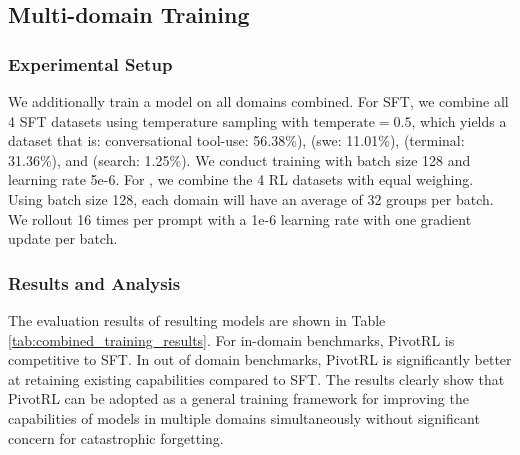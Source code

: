 \subsection{Multi-domain Training}
\subsubsection{Experimental Setup}
We additionally train a model on all domains combined. For SFT, we combine all 4 SFT datasets using temperature sampling with $\text{temperate}=0.5$, which yields a dataset that is: conversational tool-use: 56.38\%), (swe: 11.01\%), (terminal: 31.36\%), and (search: 1.25\%). We conduct training with batch size 128 and learning rate 5e-6. For \name, we combine the 4 RL datasets with equal weighing. Using batch size 128, each domain will have an average of 32 groups per batch. We rollout 16 times per prompt with a 1e-6 learning rate with one gradient update per batch.

\subsubsection{Results and Analysis}
The evaluation results of resulting models are shown in Table \ref{tab:combined_training_results}. For in-domain benchmarks, PivotRL is competitive to SFT. In out of domain benchmarks, PivotRL is significantly better at retaining existing capabilities compared to SFT. The results clearly show that PivotRL can be adopted as a general training framework for improving the capabilities of models in multiple domains simultaneously without significant concern for catastrophic forgetting.

